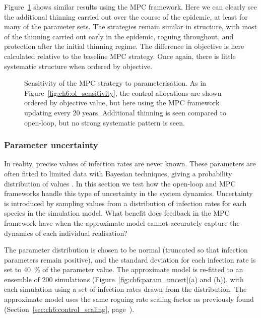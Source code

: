 Figure~\ref{fig:ch6:mpc_sensitivity} shows similar results using the MPC framework. Here we can clearly see the additional thinning carried out over the course of the epidemic, at least for many of the parameter sets. The strategies remain similar in structure, with most of the thinning carried out early in the epidemic, roguing throughout, and protection after the initial thinning regime. The difference in objective is here calculated relative to the baseline MPC strategy. Once again, there is little systematic structure when ordered by objective.

\begin{figure}[t]
    \begin{center}
        \caption[MPC strategy parameter sensitivity]{Sensitivity of the MPC strategy to parameterisation. As in Figure~\ref{fig:ch6:ol_sensitivity}, the control allocations are shown ordered by objective value, but here using the MPC framework updating every 20 years. Additional thinning is seen compared to open-loop, but no strong systematic pattern is seen.\label{fig:ch6:mpc_sensitivity}}
    \end{center}
\end{figure}

\subsubsection{Parameter uncertainty}

In reality, precise values of infection rates are never known. These parameters are often fitted to limited data with Bayesian techniques, giving a probability distribution of values \citep[e.g.][]{kleczkowski_parameter_2007, parry_bayesian_2014, thompson_control_2018, cunniffe_cost-effective_2014}. In this section we test how the open-loop and MPC frameworks handle this type of uncertainty in the system dynamics. Uncertainty is introduced by sampling values from a distribution of infection rates for each species in the simulation model. What benefit does feedback in the MPC framework have when the approximate model cannot accurately capture the dynamics of each individual realisation?

The parameter distribution is chosen to be normal (truncated so that infection parameters remain positive), and the standard deviation for each infection rate is set to \SI{40}{\percent} of the parameter value. The approximate model is re-fitted to an ensemble of 200 simulations (Figure~\ref{fig:ch6:param_uncert}(a) and (b)), with each simulation using a set of infection rates drawn from the distribution. The approximate model uses the same roguing rate scaling factor as previously found (Section~\ref{sec:ch6:control_scaling}, page~\pageref{sec:ch6:control_scaling}).

